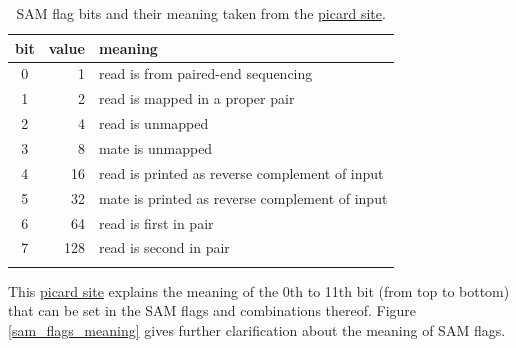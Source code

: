 \documentclass{article}\usepackage[]{graphicx}\usepackage[]{color}
\begin{document}
\begin{table}
\centering
\caption{SAM flag bits and their meaning taken from the \href{http://picard.sourceforge.net/explain-flags.html}{picard site}.}
\begin{tabular}{crl}
\toprule
bit & value & meaning \\
\midrule
0 & 1 & read is from paired-end sequencing \\
1 & 2 & read is mapped in a proper pair \\
2 & 4 & read is unmapped \\
3 & 8 & mate is unmapped \\
4 & 16 & read is printed as reverse complement of input \\
5 & 32 & mate is printed as reverse complement of input \\
6 & 64 & read is first in pair \\
7 & 128 & read is second in pair \\
\bottomrule
\label{SAM_flag_bits}
\end{tabular}
\end{table}

This \href{http://picard.sourceforge.net/explain-flags.html}{picard site} explains the meaning of the 0th to 11th bit (from top to bottom) that can be set in the SAM flags and combinations thereof. Figure \ref{sam_flags_meaning} gives further clarification about the meaning of SAM flags.
\end{document}
